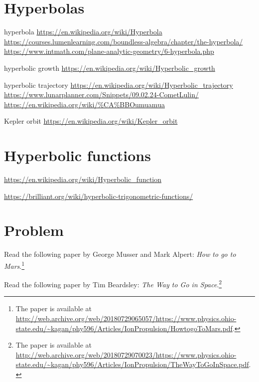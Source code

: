 \documentclass[a4paper,oneside,12pt]{article}
\begin{document}

\section{Hyperbolas}

{\color{red}
\begin{packeditem}
\item hyperbola
  \url{https://en.wikipedia.org/wiki/Hyperbola}
  \url{https://courses.lumenlearning.com/boundless-algebra/chapter/the-hyperbola/}
  \url{https://www.intmath.com/plane-analytic-geometry/6-hyperbola.php}

\item hyperbolic growth
  \url{https://en.wikipedia.org/wiki/Hyperbolic_growth}

\item hyperbolic trajectory
  \url{https://en.wikipedia.org/wiki/Hyperbolic_trajectory}
  \url{https://www.lunarplanner.com/Snippets/09.02.24-CometLulin/}
  \url{https://en.wikipedia.org/wiki/\%CA\%BBOumuamua}

\item Kepler orbit
  \url{https://en.wikipedia.org/wiki/Kepler_orbit}
\end{packeditem}
}



\section{Hyperbolic functions}

{\color{red}
\begin{packeditem}
\item \url{https://en.wikipedia.org/wiki/Hyperbolic_function}

\item \url{https://brilliant.org/wiki/hyperbolic-trigonometric-functions/}
\end{packeditem}
}


\newpage

\section*{Problem}

\begin{problem}
\item Read the following paper by George Musser and Mark Alpert:
  \emph{How to go to Mars}.\footnote{
    The paper is available at
    \url{http://web.archive.org/web/20180729065057/https://www.physics.ohio-state.edu/~kagan/phy596/Articles/IonPropulsion/HowtogoToMars.pdf}.
  }

\item Read the following paper by Tim Beardsley:
  \emph{The Way to Go in Space}.\footnote{
    The paper is available at
    \url{http://web.archive.org/web/20180729070023/https://www.physics.ohio-state.edu/~kagan/phy596/Articles/IonPropulsion/TheWayToGoInSpace.pdf}.
  }
\end{problem}
\end{document}
